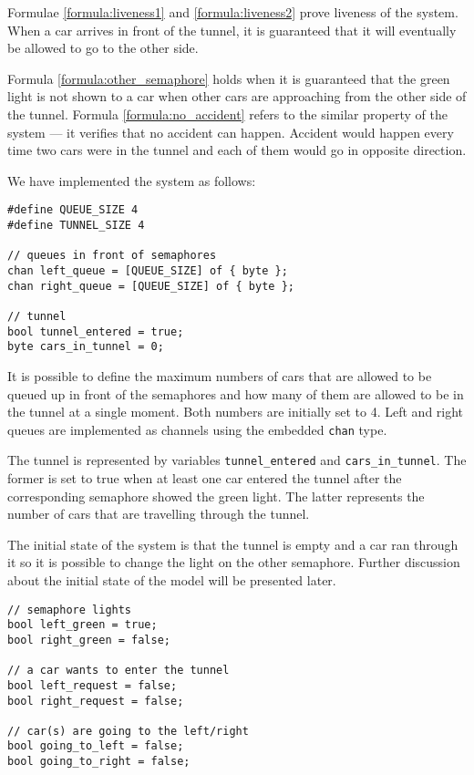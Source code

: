 Formulae \ref{formula:liveness1} and \ref{formula:liveness2} prove liveness of the system. When a car arrives in front of the tunnel, it is guaranteed that it will eventually be allowed to go to the other side.

Formula \ref{formula:other_semaphore} holds when it is guaranteed that the green light is not shown to a car when other cars are approaching from the other side of the tunnel. Formula \ref{formula:no_accident} refers to the similar property of the system --- it verifies that no accident can happen. Accident would happen every time two cars were in the tunnel and each of them would go in opposite direction.

We have implemented the system as follows:

\begin{lstlisting}[name=construction]
#define QUEUE_SIZE 4
#define TUNNEL_SIZE 4

// queues in front of semaphores
chan left_queue = [QUEUE_SIZE] of { byte };
chan right_queue = [QUEUE_SIZE] of { byte };

// tunnel
bool tunnel_entered = true;
byte cars_in_tunnel = 0;
\end{lstlisting}

It is possible to define the maximum numbers of cars that are allowed to be queued up in front of the semaphores and how many of them are allowed to be in the tunnel at a single moment. Both numbers are initially set to 4. Left and right queues are implemented as channels using the embedded \verb|chan| type.

The tunnel is represented by variables \verb|tunnel_entered| and \verb|cars_in_tunnel|. The former is set to true when at least one car entered the tunnel after the corresponding semaphore showed the green light. The latter represents the number of cars that are travelling through the tunnel.

The initial state of the system is that the tunnel is empty and a car ran through it so it is possible to change the light on the other semaphore. Further discussion about the initial state of the model will be presented later.

\begin{lstlisting}[name=construction]
// semaphore lights
bool left_green = true;
bool right_green = false;

// a car wants to enter the tunnel
bool left_request = false;
bool right_request = false;

// car(s) are going to the left/right
bool going_to_left = false;
bool going_to_right = false;
\end{lstlisting}

